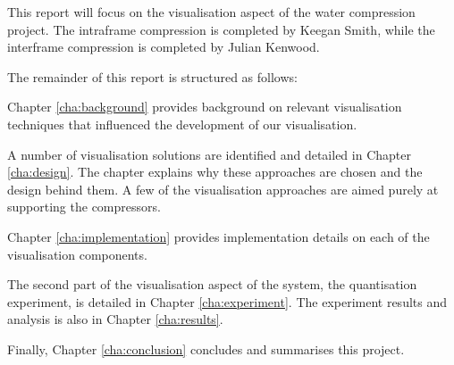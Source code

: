 This report will focus on the visualisation aspect of the water compression
project. The intraframe compression is completed by Keegan Smith, while the
interframe compression is completed by Julian Kenwood.

The remainder of this report is structured as follows:

Chapter \ref{cha:background} provides background on relevant visualisation
techniques that influenced the development of our visualisation.

A number of visualisation solutions are identified and detailed in Chapter
\ref{cha:design}. The chapter explains why these approaches are chosen and the
design behind them. A few of the visualisation approaches are aimed purely at
supporting the compressors.

Chapter \ref{cha:implementation} provides implementation details on each of the
visualisation components.

The second part of the visualisation aspect of the system, the quantisation
experiment, is detailed in Chapter \ref{cha:experiment}. The experiment results
and analysis is also in Chapter \ref{cha:results}.

Finally, Chapter \ref{cha:conclusion} concludes and summarises this project.


